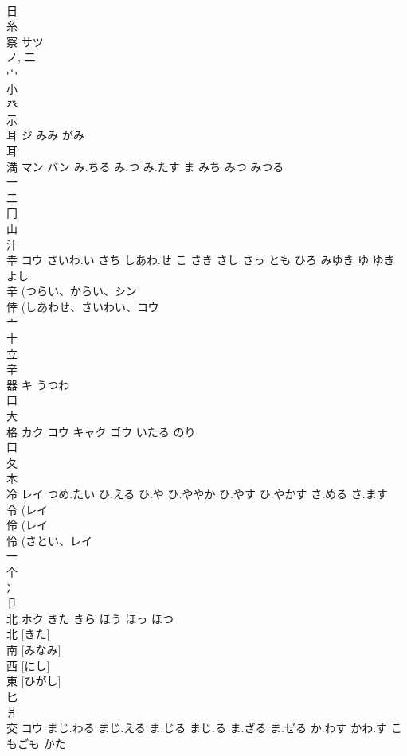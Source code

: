 \documentclass[8pt]{extreport}
\begin{document}
\begin{CJK}{UTF8}{min}
\\	日 
\\	糸 
\\	察	サツ		
\\	ノ, 二 
\\	宀 
\\	小 
\\	癶 
\\	示 
\\	耳	ジ	みみ がみ	
\\	耳 
\\	満	マン バン	み.ちる み.つ み.たす ま みち みつ みつる	
\\	一 
\\	二 
\\	冂 
\\	山 
\\	汁 
\\	幸	コウ	さいわ.い さち しあわ.せ こ さき さし さっ とも ひろ みゆき ゆ ゆき よし	
\\	辛 (つらい、からい、シン 
\\	倖 (しあわせ、さいわい、コウ 
\\	亠 
\\	十 
\\	立 
\\	辛 
\\	器	キ	うつわ	
\\	口 
\\	大 
\\	格	カク コウ キャク ゴウ	いたる のり	
\\	口 
\\	夂 
\\	木 
\\	冷	レイ	つめ.たい ひ.える ひ.や ひ.ややか ひ.やす ひ.やかす さ.める さ.ます	
\\	令 (レイ 
\\	伶 (レイ 
\\	怜 (さとい、レイ 
\\	一 
\\	个 
\\	冫 
\\	卩 
\\	北	ホク	きた きら ほう ほっ ほつ	
\\	北 [きた] 
\\	南 [みなみ] 
\\	西 [にし] 
\\	東 [ひがし] 
\\	匕 
\\	爿 
\\	交	コウ	まじ.わる まじ.える ま.じる まじ.る ま.ざる ま.ぜる か.わす かわ.す こもごも かた	

\end{CJK}
\end{document}
